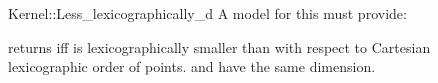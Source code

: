 \begin{ccRefFunctionObjectConcept}{Kernel::Less_lexicographically_d}
A model for this must provide:


 {returns  iff  is
  lexicographically smaller than  with respect to Cartesian
  lexicographic order of points.  \ccPrecond {} and  have
  the same dimension.}

\end{ccRefFunctionObjectConcept}
